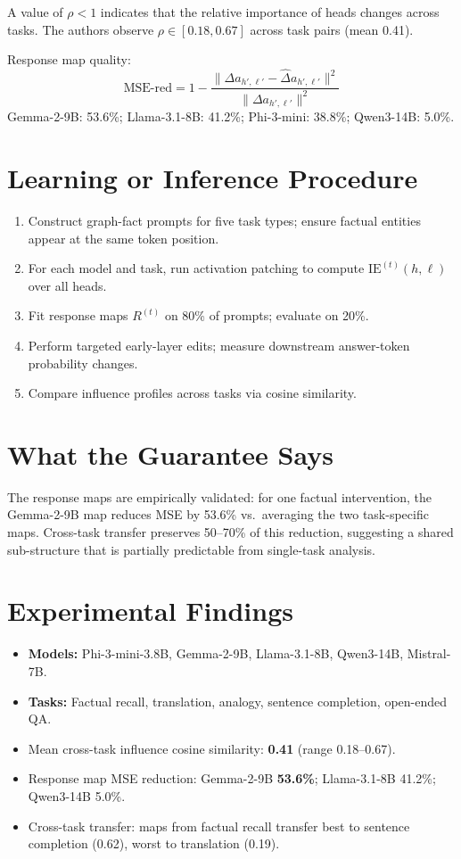 \documentclass[10pt,twocolumn]{article}
\begin{document}
A value of $\rho < 1$ indicates that the relative importance of heads
changes across tasks. The authors observe $\rho \in [0.18, 0.67]$ across
task pairs (mean 0.41).

Response map quality:
\[
\mathrm{MSE\text{-}red} = 1 - \frac{\|\Delta a_{h',\ell'} - \hat{\Delta}a_{h',\ell'}\|^2}
                                    {\|\Delta a_{h',\ell'}\|^2}
\]
Gemma-2-9B: 53.6\%; Llama-3.1-8B: 41.2\%; Phi-3-mini: 38.8\%; Qwen3-14B: 5.0\%.

\section{Learning or Inference Procedure}

\begin{enumerate}[itemsep=2pt,parsep=0pt]
  \item Construct graph-fact prompts for five task types; ensure factual
    entities appear at the same token position.
  \item For each model and task, run activation patching to compute
    $\mathrm{IE}^{(t)}(h,\ell)$ over all heads.
  \item Fit response maps $R^{(t)}$ on 80\% of prompts; evaluate on 20\%.
  \item Perform targeted early-layer edits; measure downstream answer-token
    probability changes.
  \item Compare influence profiles across tasks via cosine similarity.
\end{enumerate}

\section{What the Guarantee Says}

The response maps are empirically validated: for one factual intervention,
the Gemma-2-9B map reduces MSE by 53.6\% vs.\ averaging the two
task-specific maps. Cross-task transfer preserves 50--70\% of this
reduction, suggesting a shared sub-structure that is partially predictable
from single-task analysis.

\section{Experimental Findings}

\begin{itemize}[itemsep=2pt,parsep=0pt]
  \item \textbf{Models:} Phi-3-mini-3.8B, Gemma-2-9B, Llama-3.1-8B, Qwen3-14B,
    Mistral-7B.
  \item \textbf{Tasks:} Factual recall, translation, analogy, sentence
    completion, open-ended QA.
  \item Mean cross-task influence cosine similarity: \textbf{0.41}
    (range 0.18--0.67).
  \item Response map MSE reduction: Gemma-2-9B \textbf{53.6\%}; Llama-3.1-8B
    41.2\%; Qwen3-14B 5.0\%.
  \item Cross-task transfer: maps from factual recall transfer best to sentence
    completion (0.62), worst to translation (0.19).
\end{itemize}
\end{document}
